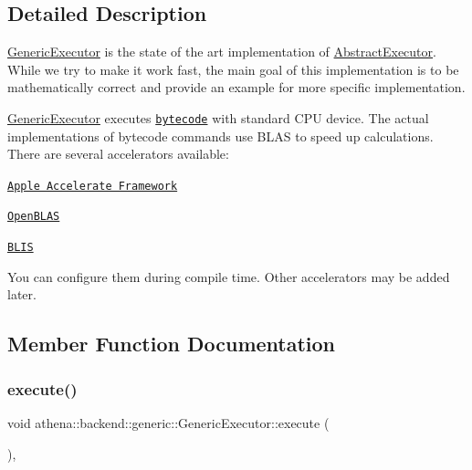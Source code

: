 \subsection{Detailed Description}
\mbox{\hyperlink{classathena_1_1backend_1_1generic_1_1_generic_executor}{Generic\+Executor}} is the state of the art implementation of \mbox{\hyperlink{classathena_1_1backend_1_1_abstract_executor}{Abstract\+Executor}}. While we try to make it work fast, the main goal of this implementation is to be mathematically correct and provide an example for more specific implementation. 

\mbox{\hyperlink{classathena_1_1backend_1_1generic_1_1_generic_executor}{Generic\+Executor}} executes \href{https://athenaframework.ml/athena/bytecode/basics.html}{\tt bytecode} with standard C\+PU device. The actual implementations of bytecode commands use B\+L\+AS to speed up calculations. There are several accelerators available\+: 
\begin{DoxyItemize}
\item \href{https://developer.apple.com/documentation/accelerate}{\tt Apple Accelerate Framework}  
\item \href{https://github.com/xianyi/OpenBLAS.git}{\tt Open\+B\+L\+AS}  
\item \href{https://github.com/flame/blis.git}{\tt B\+L\+IS}  
\end{DoxyItemize}You can configure them during compile time. Other accelerators may be added later. 

\subsection{Member Function Documentation}
\mbox{\label{classathena_1_1backend_1_1generic_1_1_generic_executor_a38b56c284050d31198b28fcb6595bc73}} 
\subsubsection{\texorpdfstring{execute()}{execute()}}
{\footnotesize\ttfamily void athena\+::backend\+::generic\+::\+Generic\+Executor\+::execute (\begin{DoxyParamCaption}{ }\end{DoxyParamCaption})\hspace{0.3cm}{\ttfamily [override]}, {\ttfamily [virtual]}}

